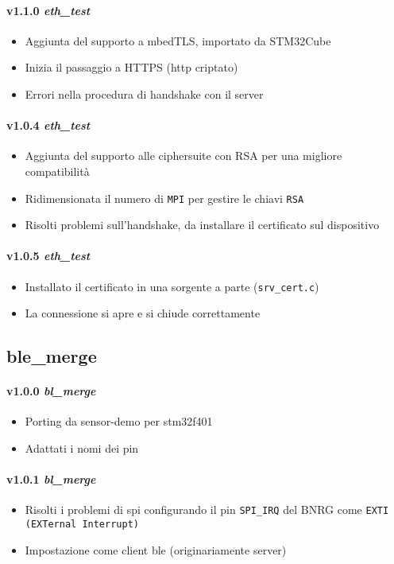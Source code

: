 \paragraph{v1.1.0 \textit{eth\_test}}
	\begin{itemize}
		\item Aggiunta del supporto a mbedTLS, importato da STM32Cube
		\item Inizia il passaggio a HTTPS (http criptato)
		\item Errori nella procedura di handshake con il server
	\end{itemize}
\paragraph{v1.0.4 \textit{eth\_test}}
	\begin{itemize}
		\item Aggiunta del supporto alle ciphersuite con RSA per una migliore compatibilit\`{a}
    \item Ridimensionata il numero di \texttt{MPI} per gestire le chiavi \texttt{RSA}
		\item Risolti problemi sull'handshake, da installare il certificato sul dispositivo
	\end{itemize}
\paragraph{v1.0.5 \textit{eth\_test}}
	\begin{itemize}
		\item Installato il certificato in una sorgente a parte (\texttt{srv\_cert.c})
		\item La connessione si apre e si chiude correttamente
	\end{itemize}

\subsection*{ble\_merge}

\paragraph{v1.0.0 \textit{bl\_merge}}
	\begin{itemize}
		\item Porting da sensor-demo per stm32f401
		\item Adattati i nomi dei pin
	\end{itemize}
\paragraph{v1.0.1 \textit{bl\_merge}}
	\begin{itemize}
    \item Risolti i problemi di spi configurando il pin \texttt{SPI\_IRQ} del BNRG come \texttt{EXTI (EXTernal Interrupt)}
		\item Impostazione come client ble (originariamente server)
	\end{itemize}
